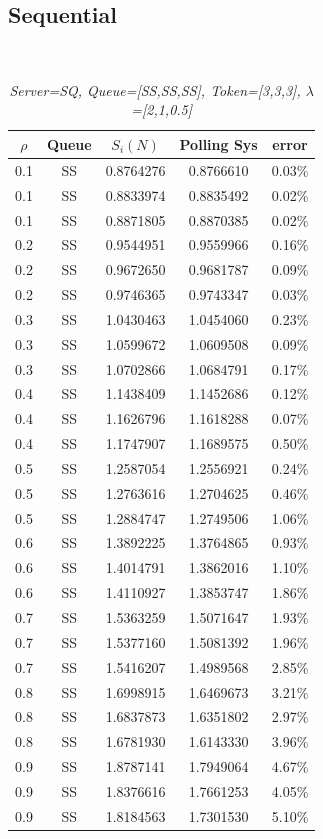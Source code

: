 \documentclass[12pt,a4paper,italian]{article}
\begin{document}
\subsection{Sequential}
\ \
\begin{table}[hb!]
	\begin{minipage}[b]{0.48\linewidth}\centering
	\centering
		\caption{\scriptsize \emph{Server=SQ, Queue=[SS,SS,SS], Token=[3,3,3], $\lambda$=[2,1,0.5]}}
		\label{tab1}
	\tiny
	\begin{tabular}{c c c c c}
		\hline
		$\rho$ & Queue & $S_i(N)$ & Polling Sys & error \\ \hline
		0.1 & SS & 0.8764276 &   0.8766610    & 0.03\% \\
		0.1 & SS & 0.8833974 &   0.8835492    & 0.02\% \\
		0.1 & SS & 0.8871805 &   0.8870385    & 0.02\% \\ \hline \hline
		0.2 & SS & 0.9544951 &   0.9559966    & 0.16\% \\
		 0.2 & SS & 0.9672650 &   0.9681787    & 0.09\%  \\
		 0.2 & SS & 0.9746365 &   0.9743347    & 0.03\% \\ \hline \hline
		 0.3 & SS & 1.0430463 &   1.0454060    & 0.23\% \\ 
		 0.3 & SS & 1.0599672 &   1.0609508    & 0.09\% \\
		 0.3 & SS & 1.0702866 &   1.0684791    & 0.17\% \\ \hline \hline
		 0.4 & SS & 1.1438409 &   1.1452686    & 0.12\% \\
		 0.4 & SS & 1.1626796 &   1.1618288    & 0.07\% \\
		 0.4 & SS & 1.1747907 &   1.1689575    & 0.50\% \\ \hline \hline
		 0.5 & SS & 1.2587054 &   1.2556921    & 0.24\% \\
		 0.5 & SS & 1.2763616 &   1.2704625    & 0.46\% \\
		 0.5 & SS & 1.2884747 &   1.2749506    & 1.06\% \\ \hline \hline
		 0.6 & SS & 1.3892225 &   1.3764865    & 0.93\% \\
		 0.6 & SS & 1.4014791 &   1.3862016    & 1.10\% \\
		 0.6 & SS & 1.4110927 &   1.3853747    & 1.86\%\\ \hline \hline
		 0.7 & SS & 1.5363259 &   1.5071647    & 1.93\% \\
		 0.7 & SS & 1.5377160 &   1.5081392    & 1.96\% \\
		 0.7 & SS & 1.5416207 &   1.4989568    & 2.85\% \\ \hline \hline
		 0.8 & SS & 1.6998915 &   1.6469673    & 3.21\% \\
		 0.8 & SS & 1.6837873 &   1.6351802    & 2.97\% \\
		 0.8 & SS & 1.6781930 &   1.6143330    & 3.96\% \\ \hline \hline
		 0.9 & SS & 1.8787141 &   1.7949064    & 4.67\% \\
		 0.9 & SS & 1.8376616 &   1.7661253    & 4.05\% \\
		 0.9 & SS & 1.8184563 &   1.7301530    & 5.10\% \\ \hline
		

\end{tabular}
\end{minipage}
\end{table}
\end{document}
